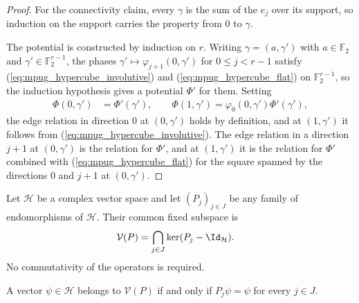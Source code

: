 \begin{proof}\leanok
    For the connectivity claim, every $\gamma$ is the sum of the $e_j$ over
    its support, so induction on the support carries the property from $0$ to
    $\gamma$.

    The potential is constructed by induction on $r$. Writing
    $\gamma=(a,\gamma')$ with $a\in\mathbb F_2$ and
    $\gamma'\in\mathbb F_2^{r-1}$, the phases
    $\gamma'\mapsto\varphi_{j+1}(0,\gamma')$ for $0\leq j<r-1$ satisfy
    (\ref{eq:mpug_hypercube_involutive}) and (\ref{eq:mpug_hypercube_flat})
    on $\mathbb F_2^{r-1}$, so the induction hypothesis gives a potential
    $\Phi'$ for them. Setting
    \begin{align}
        \Phi(0,\gamma') & =\Phi'(\gamma'),
        \qquad
        \Phi(1,\gamma')=\varphi_0(0,\gamma')\Phi'(\gamma'),
        \label{eq:mpug_hypercube_potential_step}
    \end{align}
    the edge relation in direction $0$ at $(0,\gamma')$ holds by definition,
    and at $(1,\gamma')$ it follows from
    (\ref{eq:mpug_hypercube_involutive}). The edge relation in a direction
    $j+1$ at $(0,\gamma')$ is the relation for $\Phi'$, and at $(1,\gamma')$
    it is the relation for $\Phi'$ combined with
    (\ref{eq:mpug_hypercube_flat}) for the square spanned by the directions
    $0$ and $j+1$ at $(0,\gamma')$.
\end{proof}

\begin{definition}
    \label{def:mpug_common_fixed_subspace}
    \leanok
    Let $\mathcal H$ be a complex vector space and let $(P_j)_{j\in J}$ be any
    family of endomorphisms of $\mathcal H$. Their common fixed subspace is
    \begin{align}
        \mathcal V(P)
         & =\bigcap_{j\in J}\ker(P_j-\Id_{\mathcal H}).
    \end{align}
    No commutativity of the operators is required.
\end{definition}

\begin{lemma}
    \label{thm:mpug_mem_common_fixed_subspace}
    \leanok
    A vector $\psi\in\mathcal H$ belongs to $\mathcal V(P)$ if and only if
    $P_j\psi=\psi$ for every $j\in J$.
\end{lemma}

